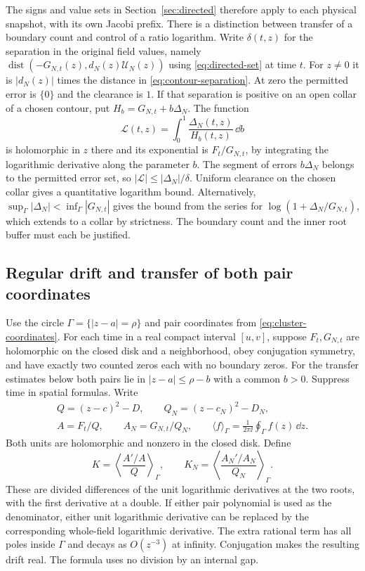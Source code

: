 The signs and value sets in Section~\ref{sec:directed} therefore
apply to each physical snapshot, with its own Jacobi prefix. There
is a distinction between transfer of a boundary count and control
of a ratio logarithm. Write \(\delta(t,z)\) for the separation in the
original field values, namely
\(\operatorname{dist}(-G_{N,t}(z),d_N(z)\mathcal U_N(z))\)
using \eqref{eq:directed-set} at time \(t\).
For \(z\ne0\) it is \(|d_N(z)|\) times the distance in
\eqref{eq:contour-separation}. At zero the permitted error is
\(\{0\}\) and the clearance is \(1\). If that separation is positive
on an open collar of a chosen contour, put \(H_b=G_{N,t}+b\Delta_N\).
The function
\[
 \mathcal L(t,z)=\int_0^1\frac{\Delta_N(t,z)}{H_b(t,z)}\,\dd b
\]
is holomorphic in \(z\) there and its exponential is \(F_t/G_{N,t}\),
by integrating the logarithmic derivative along the parameter \(b\).
The segment of errors \(b\Delta_N\) belongs to the permitted error set,
so \(|\mathcal L|\le|\Delta_N|/\delta\). Uniform clearance on the
chosen collar gives a quantitative logarithm bound. Alternatively,
\(\sup_\Gamma|\Delta_N|<\inf_\Gamma|G_{N,t}|\) gives the bound from the
series for \(\log(1+\Delta_N/G_{N,t})\), which extends to a collar by
strictness. The boundary count and the inner root buffer must each
be justified.

\subsection{Regular drift and transfer of both pair coordinates}

Use the circle \(\Gamma=\{|z-a|=\rho\}\) and pair coordinates from
\eqref{eq:cluster-coordinates}. For each time in a real compact
interval \([u,v]\), suppose \(F_t,G_{N,t}\) are holomorphic on the
closed disk and a neighborhood, obey conjugation symmetry, and
have exactly two counted zeros each with no boundary zeros. For the
transfer estimates below both pairs lie in \(|z-a|\le\rho-b\) with
a common \(b>0\). Suppress time in spatial formulas. Write
\[
 \begin{gathered}
 Q=(z-c)^2-D,\qquad Q_N=(z-c_N)^2-D_N,\\
 A=F_t/Q,\qquad A_N=G_{N,t}/Q_N,\qquad
 \langle f\rangle_\Gamma=\frac{1}{2\pi\ii}\oint_\Gamma f(z)\,\dd z .
 \end{gathered}
\]
Both units are holomorphic and nonzero in the closed disk. Define
\begin{equation}
 K=\left\langle\frac{A'/A}{Q}\right\rangle_\Gamma,\qquad
 K_N=\left\langle\frac{A_N'/A_N}{Q_N}\right\rangle_\Gamma .
 \label{eq:gt-regular-drift}
\end{equation}
These are divided differences of the unit logarithmic derivatives at
the two roots, with the first derivative at a double. If either pair
polynomial is used as the denominator, either unit logarithmic
derivative can be replaced by the corresponding whole-field
logarithmic derivative. The extra rational term has all poles
inside \(\Gamma\) and decays as \(O(z^{-3})\) at infinity.
Conjugation makes the resulting drift real. The formula uses no
division by an internal gap.

